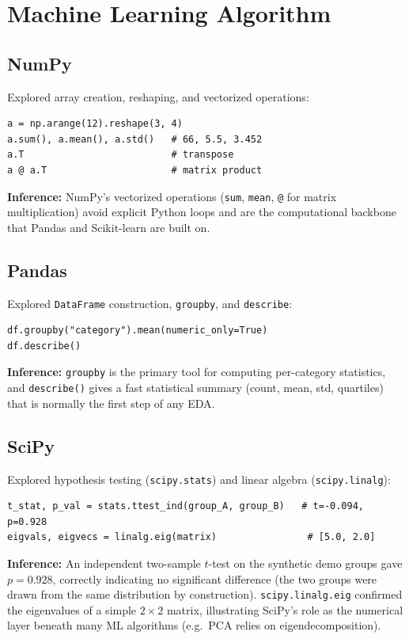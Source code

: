 \documentclass[12pt,a4paper]{article}
\begin{document}
\section{Machine Learning Algorithm}

\subsection*{NumPy}
Explored array creation, reshaping, and vectorized operations:
\begin{lstlisting}
a = np.arange(12).reshape(3, 4)
a.sum(), a.mean(), a.std()   # 66, 5.5, 3.452
a.T                          # transpose
a @ a.T                      # matrix product
\end{lstlisting}
\textbf{Inference:} NumPy's vectorized operations (\texttt{sum}, \texttt{mean},
\texttt{@} for matrix multiplication) avoid explicit Python loops and are the
computational backbone that Pandas and Scikit-learn are built on.

\subsection*{Pandas}
Explored \texttt{DataFrame} construction, \texttt{groupby}, and \texttt{describe}:
\begin{lstlisting}
df.groupby("category").mean(numeric_only=True)
df.describe()
\end{lstlisting}
\textbf{Inference:} \texttt{groupby} is the primary tool for computing per-category
statistics, and \texttt{describe()} gives a fast statistical summary (count, mean, std,
quartiles) that is normally the first step of any EDA.

\subsection*{SciPy}
Explored hypothesis testing (\texttt{scipy.stats}) and linear algebra
(\texttt{scipy.linalg}):
\begin{lstlisting}
t_stat, p_val = stats.ttest_ind(group_A, group_B)   # t=-0.094, p=0.928
eigvals, eigvecs = linalg.eig(matrix)                # [5.0, 2.0]
\end{lstlisting}
\textbf{Inference:} An independent two-sample $t$-test on the synthetic demo groups gave
$p=0.928$, correctly indicating no significant difference (the two groups were drawn
from the same distribution by construction). \texttt{scipy.linalg.eig} confirmed the
eigenvalues of a simple $2\times2$ matrix, illustrating SciPy's role as the numerical
layer beneath many ML algorithms (e.g.\ PCA relies on eigendecomposition).
\end{document}
